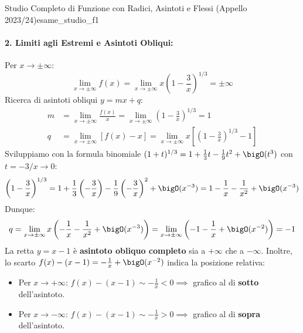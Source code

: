 \begin{esempio}{Studio Completo di Funzione con Radici, Asintoti e Flessi (Appello 2023/24)}{esame_studio_f1}
\paragraph{2. Limiti agli Estremi e Asintoti Obliqui:}
Per $x \to \pm \infty$:
\[
    \lim_{x \to \pm \infty} f(x) = \lim_{x \to \pm \infty} x \left(1 - \frac{3}{x}\right)^{1/3} = \pm \infty
\]
Ricerca di asintoti obliqui $y = mx + q$:
\begin{align*}
    m &= \lim_{x \to \pm \infty} \frac{f(x)}{x} = \lim_{x \to \pm \infty} \left(1 - \frac{3}{x}\right)^{1/3} = 1 \\
    q &= \lim_{x \to \pm \infty} [f(x) - x] = \lim_{x \to \pm \infty} x\left[\left(1 - \frac{3}{x}\right)^{1/3} - 1\right]
\end{align*}
Sviluppiamo con la formula binomiale $(1 + t)^{1/3} = 1 + \frac{1}{3}t - \frac{1}{9}t^2 + \bigO(t^3)$ con $t = -3/x \to 0$:
\[
    \left(1 - \frac{3}{x}\right)^{1/3} = 1 + \frac{1}{3}\left(-\frac{3}{x}\right) - \frac{1}{9}\left(-\frac{3}{x}\right)^2 + \bigO(x^{-3}) = 1 - \frac{1}{x} - \frac{1}{x^2} + \bigO(x^{-3})
\]
Dunque:
\[
    q = \lim_{x \to \pm \infty} x\left(-\frac{1}{x} - \frac{1}{x^2} + \bigO(x^{-3})\right) = \lim_{x \to \pm \infty} \left(-1 - \frac{1}{x} + \bigO(x^{-2})\right) = -1
\]
La retta $y = x - 1$ è \textbf{asintoto obliquo completo} sia a $+\infty$ che a $-\infty$.
Inoltre, lo scarto $f(x) - (x - 1) = -\frac{1}{x} + \bigO(x^{-2})$ indica la posizione relativa:
\begin{itemize}
    \item Per $x \to +\infty$: $f(x) - (x - 1) \sim -\frac{1}{x} < 0 \implies$ grafico al di \textbf{sotto} dell'asintoto.
    \item Per $x \to -\infty$: $f(x) - (x - 1) \sim -\frac{1}{x} > 0 \implies$ grafico al di \textbf{sopra} dell'asintoto.
\end{itemize}


\end{esempio}
